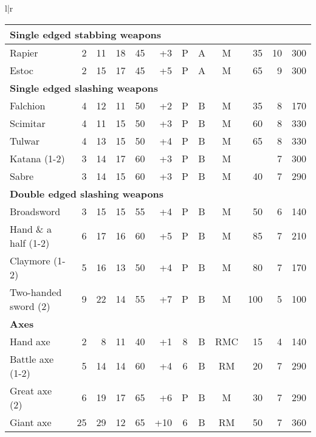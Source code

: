 \begin{tabular}[t]{l|r}
\begin{minipage}[t]{4.8in}
\begin{tabularx}{\linewidth}[t]{Xrrrrrcccrrr}
\multicolumn{12}{l}{\textbf{Single edged stabbing weapons}} \\ \hline
Rapier				& 2	& 11	& 18	& 45	& +3	& P	& A	& M	& 35	& 10	& 300 \\ \hline
Estoc				& 2	& 15	& 17	& 45	& +5	& P	& A	& M	& 65	& 9	& 300 \\ \hline

\multicolumn{12}{l}{\textbf{Single edged slashing weapons}} \\ \hline
Falchion			& 4	& 12	& 11	& 50	& +2	& P	& B	& M	& 35	& 8	& 170 \\ \hline
Scimitar			& 4	& 11	& 15	& 50	& +3	& P	& B	& M	& 60	& 8	& 330 \\ \hline
Tulwar				& 4	& 13	& 15	& 50	& +4	& P	& B	& M	& 65	& 8	& 330 \\ \hline
Katana (1-2)			& 3	& 14	& 17	& 60	& +3	& P	& B	& M	& 	& 7 	& 300 \\ \hline
Sabre				& 3	& 14	& 15	& 60	& +3	& P	& B	& M	& 40	& 7	& 290 \\ \hline

\multicolumn{12}{l}{\textbf{Double edged slashing weapons}} \\ \hline
Broadsword			& 3	& 15	& 15	& 55	& +4	& P	& B	& M	& 50	& 6	& 140 \\ \hline
Hand \& a half (1-2)		& 6	& 17	& 16	& 60	& +5	& P	& B	& M	& 85	& 7	& 210 \\ \hline
Claymore (1-2)			& 5	& 16	& 13	& 50	& +4	& P	& B	& M	& 80	& 7	& 170 \\ \hline
Two-handed sword (2)		& 9	& 22	& 14	& 55	& +7	& P	& B	& M	& 100	& 5	& 100 \\ \hline

\multicolumn{12}{l}{\textbf{Axes}} \\ \hline
Hand axe			& 2	& 8	& 11	& 40	& +1	& 8	& B	& RMC	& 15	& 4	& 140 \\ \hline
Battle axe (1-2)		& 5	& 14	& 14	& 60	& +4	& 6	& B	& RM	& 20	& 7	& 290 \\ \hline
Great axe (2)			& 6	& 19	& 17	& 65	& +6	& P	& B	& M	& 30	& 7	& 290 \\ \hline
Giant axe\footnotemark		& 25	& 29	& 12	& 65	& +10	& 6	& B	& RM	& 50	& 7	& 360 \\ \hline


\end{tabularx}
\end{minipage}
\end{tabular}
